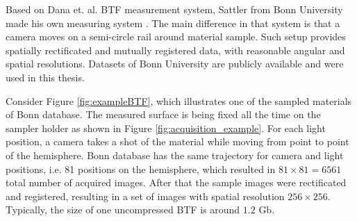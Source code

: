 Based on Dana et. al. BTF measurement system, Sattler from Bonn University made his own measuring system \cite{sattler-2003-efficient}.
 The main difference in that system is that a camera moves on a semi-circle rail around material sample.
Such setup provides spatially rectificated and mutually registered data, with reasonable angular and spatial resolutions. 
Datasets of Bonn University \cite{btfBonn} are publicly available and were used in this thesis.


 Consider Figure \ref{fig:exampleBTF}, which illustrates one of the sampled materials of Bonn database.
The measured surface is being fixed all the time on the sampler holder as shown in Figure \ref{fig:acquisition_example}. For each light position, a camera takes a shot of the material while moving from point to point of the hemisphere.
Bonn database has the same trajectory for camera and light positions, i.e. 81 positions on the hemisphere, which resulted in $81\times81=6561$ total number of acquired images.
After that the sample images were rectificated and registered, resulting in a set of images with spatial resolution $256\times256$.
Typically, the size of one uncompressed BTF is around $1.2$ Gb.






